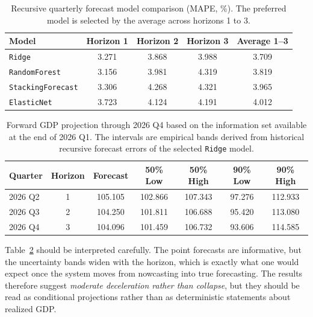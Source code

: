 \documentclass[12pt,a4paper]{report}
\begin{document}
\begin{table}[H]
    \centering
    \small
    \caption{Recursive quarterly forecast model comparison (MAPE, \%). The preferred model is selected by the average across horizons 1 to 3.}
    \label{tab:forward_model_scores}
    \begin{tabular}{lcccc}
        \hline
        Model & Horizon 1 & Horizon 2 & Horizon 3 & Average 1--3 \\
        \hline
        \texttt{Ridge} & 3.271 & 3.868 & 3.988 & 3.709 \\
        \texttt{RandomForest} & 3.156 & 3.981 & 4.319 & 3.819 \\
        \texttt{StackingForecast} & 3.306 & 4.268 & 4.321 & 3.965 \\
        \texttt{ElasticNet} & 3.723 & 4.124 & 4.191 & 4.012 \\
        \hline
    \end{tabular}
\end{table}

\begin{table}[H]
    \centering
    \small
    \caption{Forward GDP projection through 2026 Q4 based on the information set available at the end of 2026 Q1. The intervals are empirical bands derived from historical recursive forecast errors of the selected \texttt{Ridge} model.}
    \label{tab:forward_forecast_2026}
    \begin{tabular}{lcccccc}
        \toprule
        Quarter & Horizon & Forecast & 50\% Low & 50\% High & 90\% Low & 90\% High \\
        \midrule
        2026 Q2 & 1 & 105.105 & 102.866 & 107.343 & 97.276 & 112.933 \\
        2026 Q3 & 2 & 104.250 & 101.811 & 106.688 & 95.420 & 113.080 \\
        2026 Q4 & 3 & 104.096 & 101.459 & 106.732 & 93.606 & 114.585 \\
        \bottomrule
    \end{tabular}
\end{table}

Table~\ref{tab:forward_forecast_2026} should be interpreted carefully. The point forecasts are informative, but the uncertainty bands widen with the horizon, which is exactly what one would expect once the system moves from nowcasting into true forecasting. The results therefore suggest \textit{moderate deceleration rather than collapse}, but they should be read as conditional projections rather than as deterministic statements about realized GDP.
\end{document}
